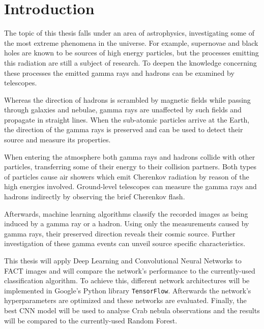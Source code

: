 \chapter{Introduction}
The topic of this thesis falls under an area of astrophysics, investigating some of the most extreme phenomena in the universe.
For example, supernovae and black holes are known to be sources of high energy particles,
but the processes emitting this radiation are still a subject of research.
To deepen the knowledge concerning these processes the emitted gamma rays and hadrons can be examined by telescopes.

Whereas the direction of hadrons is scrambled by magnetic fields while passing through galaxies and nebulae,
gamma rays are unaffected by such fields and propagate in straight lines.
When the sub-atomic particles arrive at the Earth, the direction of the gamma rays is preserved
and can be used to detect their source and measure its properties.

When entering the atmosphere both gamma rays and hadrons collide with other particles,
transferring some of their energy to their collision partners.
Both types of particles cause air showers which emit Cherenkov radiation by reason of the high energies involved.
Ground-level telescopes can measure the gamma rays and hadrons indirectly by observing the brief Cherenkov flash.

Afterwards, machine learning algorithms classify the recorded images as being induced by a gamma ray or a hadron.
Using only the measurements caused by gamma rays, their preserved direction reveals their cosmic source.
Further investigation of these gamma events can unveil source specific characteristics.

This thesis will apply Deep Learning and Convolutional Neural Networks to FACT images and
will compare the network's performance to the currently-used classification algorithm.
To achieve this, different network architectures will be implemented in Google's Python library \texttt{TensorFlow}.
Afterwards the network's hyperparameters are optimized and these networks are evaluated.
Finally, the best CNN model will be used to analyse Crab nebula observations
and the results will be compared to the currently-used Random Forest.
